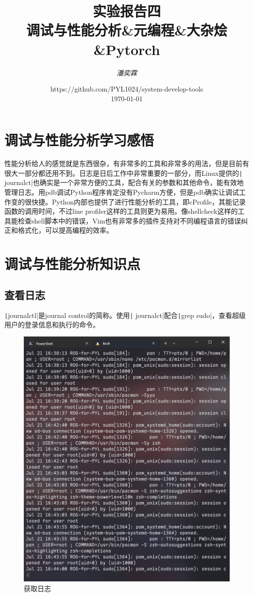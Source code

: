 \documentclass[fontset=ubuntu]{ctexart}
\title{\Huge \textbf{实验报告四 \\ 调试与性能分析\&元编程\&大杂烩\&Pytorch}}
\author{\textit{潘奕霖}}
\date{https://github.com/PYL1024/system-develop-tools\\ \today}
\begin{document}
\maketitle
\newpage

\tableofcontents
\newpage

\section{调试与性能分析学习感悟}
性能分析给人的感觉就是东西很杂，有非常多的工具和非常多的用法，但是目前有很大一部分都还用不到。日志是日后工作中非常重要的一部分，而Linux提供的\texttt| journalct|也确实是一个非常方便的工具，配合有关的参数和其他命令，能有效地管理日志。用pdb调试Python程序肯定没有Pycharm方便，但是pdb确实让调试工作变的很快捷。Python内部也提供了进行性能分析的工具，即cProfile，其能记录函数的调用时间，不过line profiler这样的工具则更为易用。像shellcheck这样的工具能检查shell脚本中的错误，Vim也有非常多的插件支持对不同编程语言的错误纠正和格式化，可以提高编程的效率。

\section{调试与性能分析知识点}
\subsection{查看日志}
\texttt|journalctl|是journal control的简称。使用\texttt| journalct|配合\texttt|grep sudo|，查看超级用户的登录信息和执行的命令。
\begin{figure}[htb]
    \centering
    \includegraphics[width=0.5\linewidth]{journalctl_1.png}
    \caption{获取日志}
    \label{fig:journalctl_1}
\end{figure}
\end{document}
